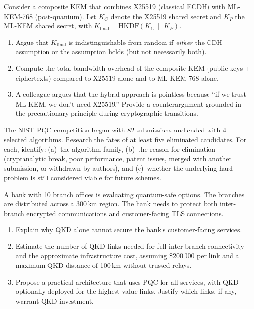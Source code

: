 \begin{prob}
\label{prob:ch05-hybrid}
Consider a composite KEM that combines X25519 (classical ECDH) with ML-KEM-768 (post-quantum).  Let $K_C$ denote the X25519 shared secret and $K_P$ the ML-KEM shared secret, with $K_{\mathrm{final}} = \mathrm{HKDF}(K_C \,\|\, K_P)$.
\begin{enumerate}
\item[(a)] Argue that $K_{\mathrm{final}}$ is indistinguishable from random if \emph{either} the CDH assumption or the \mlwe{} assumption holds (but not necessarily both).
\item[(b)] Compute the total bandwidth overhead of the composite KEM (public keys + ciphertexts) compared to X25519 alone and to ML-KEM-768 alone.
\item[(c)] A colleague argues that the hybrid approach is pointless because ``if we trust ML-KEM, we don't need X25519.''  Provide a counterargument grounded in the precautionary principle during cryptographic transitions.
\end{enumerate}
\end{prob}

\begin{prob}
\label{prob:ch05-nist}
The NIST PQC competition began with 82 submissions and ended with 4 selected algorithms.  Research the fates of at least five eliminated candidates.  For each, identify: (a)~the algorithm family, (b)~the reason for elimination (cryptanalytic break, poor performance, patent issues, merged with another submission, or withdrawn by authors), and (c)~whether the underlying hard problem is still considered viable for future schemes.
\end{prob}

\begin{prob}
\label{prob:ch05-qkd}
A bank with 10 branch offices is evaluating quantum-safe options.  The branches are distributed across a 300\,km region.  The bank needs to protect both inter-branch encrypted communications and customer-facing TLS connections.
\begin{enumerate}
\item[(a)] Explain why QKD alone cannot secure the bank's customer-facing services.
\item[(b)] Estimate the number of QKD links needed for full inter-branch connectivity and the approximate infrastructure cost, assuming \$200\,000 per link and a maximum QKD distance of 100\,km without trusted relays.
\item[(c)] Propose a practical architecture that uses PQC for all services, with QKD optionally deployed for the highest-value links.  Justify which links, if any, warrant QKD investment.
\end{enumerate}
\end{prob}
